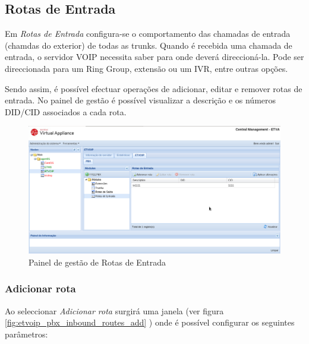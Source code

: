 \subsection{Rotas de Entrada}

Em \emph{Rotas de Entrada} configura-se o comportamento das chamadas de entrada (chamdas do exterior) de todas as trunks.
Quando é recebida uma chamada de entrada, o servidor VOIP necessita saber para onde deverá direccioná-la.
Pode ser direccionada para um Ring Group, extensão ou um IVR, entre outras opções.

Sendo assim, é possível efectuar operações de adicionar, editar e remover rotas de entrada.
No painel de gestão é possível visualizar a descrição e os números DID/CID associados a cada rota.


\begin{figure}[H]
        \begin{center}
        \includegraphics[scale=0.4]{screenshots/etvoip_pbx_inbound_routes.png}
        \caption{Painel de gestão de Rotas de Entrada}
        \label{fig:etvoip_pbx_inbound_routes}
        \end{center}
\end{figure}

\subsubsection{Adicionar rota}
\label{sec:etvoip_pbx_inbound_routes_add}

Ao seleccionar \emph{Adicionar rota} surgirá uma janela (ver figura \ref{fig:etvoip_pbx_inbound_routes_add} ) onde é possível configurar os seguintes parâmetros:

